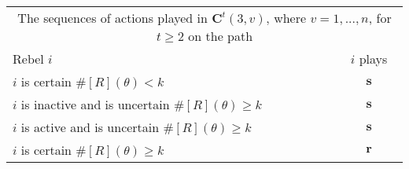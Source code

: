 \documentclass[12pt,letter]{article}
\newcommand{\Kappa}{\mathbf{C}}
\theoremstyle{definition}
\theoremstyle{remark}
\theoremstyle{claim}
\begin{document}
\begin{table}[!htbp]
\begin{center}
\begin{tabular}{l c}
\multicolumn{2}{c}{The sequences of actions played in $\Kappa^t(3,v)$, where $v=1,...,n$, for $t\geq 2$ on the path}\\
Rebel $i$ 	 	&  	$i$ plays		 \\
\hline
\hline
$i$ is certain $\#[R](\theta)<k$ 	& 	$\textbf{s}$	\\
$i$ is inactive and is uncertain $\#[R](\theta)\geq k$	& 	$ \textbf{s} $	\\
$i$ is active and is uncertain $\#[R](\theta)\geq k$ &  $ \textbf{s} $  \\
$i$ is certain $\#[R](\theta)\geq k$ &  $ \textbf{r} $  \\
\hline
\end{tabular}
\end{center}
\end{table}
\end{document}
